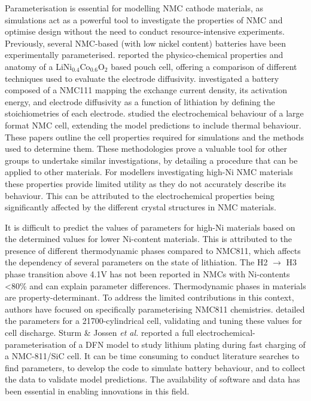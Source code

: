 \documentclass[journal=jacsat,manuscript=article]{achemso}
\begin{document}
Parameterisation is essential for modelling NMC cathode materials, as simulations act as a powerful tool to investigate the properties of NMC and optimise design without the need to conduct resource-intensive experiments.\cite{shearing_2020_3D} 
Previously, several NMC-based (with low nickel content) batteries have been experimentally parameterised. \cite{Ecker2015,Schmalstieg_Rahe_Ecker_Sauer_2018,Liebig_2019} \citeauthor{Ecker2015} reported the physico-chemical properties and anatomy of a LiNi$_{0.4}$Co$_{0.6}$O$_2$ based pouch cell, offering a comparison of different techniques used to evaluate the electrode diffusivity. \cite{Ecker2015} \citeauthor{Schmalstieg_Rahe_Ecker_Sauer_2018} investigated a battery composed of a NMC111 mapping the exchange current density, its activation energy, and electrode diffusivity as a function of lithiation by defining the stoichiometries of each electrode. \cite{Schmalstieg_Rahe_Ecker_Sauer_2018} 
\citeauthor{Liebig_2019} studied the electrochemical behaviour of a large format NMC cell, extending the model predictions to include thermal behaviour. \cite{Liebig_2019} 
These papers outline the cell properties required for simulations and the methods used to determine them. 
These methodologies prove a valuable tool for other groups to undertake similar investigations, by detailing a procedure that can be applied to other materials. 
For modellers investigating high-Ni NMC materials these properties provide limited utility as they do not accurately describe its behaviour. 
This can be attributed to the electrochemical properties being significantly affected by the different crystal structures in NMC materials.\cite{noh2013comparison} 

It is difficult to predict the values of parameters for high-Ni materials based on the determined values for lower Ni-content materials.\cite{Amin_Chiang_2016} 
This is attributed to the presence of different thermodynamic phases compared to NMC811, which affects the dependency of several parameters on the state of lithiation. 
The H2 $\rightarrow$ H3 phase transition above 4.1V has not been reported in NMCs with Ni-contents \textless80\% and can explain parameter differences.\cite{jung2017oxygen} 
Thermodynamic phases in materials are  property-determinant. To address the limited contributions in this context, authors have focused on specifically parameterising NMC811 chemistries. 
\citeauthor{Chen2020} detailed the parameters for a 21700-cylindrical cell, validating and tuning these values for cell discharge.\cite{Chen2020} 
Sturm \& Jossen \textit{et al.} reported a full electrochemical-parameterisation of a DFN model to study lithium plating during fast charging of a NMC-811/SiC cell.\cite{Sturm2019b,Sturm2019} 
It can be time consuming to conduct literature searches to find parameters, to develop the code to simulate battery behaviour, and to collect the data to validate model predictions. 
The availability of software and data has been essential in enabling innovations in this field.
\end{document}
